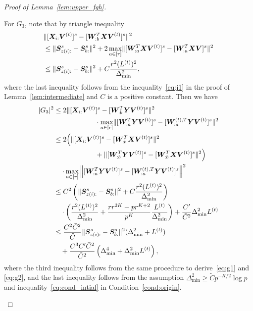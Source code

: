 \documentclass[journal]{IEEEtran}
\theoremstyle{definition}
\theoremstyle{definition}
\newcommand{\of}[1]{\left(#1\right)}
\begin{document}
\begin{proof}[Proof of Lemma~\ref{lem:upper_fgh}]
\begin{enumerate}[wide]
    For $G_3$, note that by triangle inequality
    \begin{align}
        &\onormSize{}{[\mX_{i:} \mV^{(t)}]^s  -  [  \mW_{:b}^T \mX \mV^{(t)} ]^s}^2 \\& \leq \onormSize{}{\mS_{z(i):}^s - \mS_{b:}^s}^2 + 2\max_{a \in [r]}\onormSize{}{[\mW_{:a}^T\mX \mV^{(t)}]^s - [\mW_{:a}^T\mX \mV]^s }^2\\
        & \leq \onormSize{}{\mS_{z(i):}^s - \mS_{b:}^s}^2 + C \frac{r^2 (L^{(t)})^2}{\Delta_{\min}^2}, \label{eq:g3xv_wxv}
    \end{align}
    where the last inequality follows from the inequality~\eqref{eq:j1} in the proof of Lemma~\ref{lem:intermediate} and $C$ is a positive constant.
   Then we have 
   \small
    \begin{align}
        |G_3|^2 & \leq 2 \onormSize{}{[\mX_{i:} \mV^{(t)}]^s  -  [  \mW_{:b}^T \mY \mV^{(t)} ]^s}^2  \\
        &  \quad \quad \quad \quad \quad  \quad \cdot \max_{a \in [r]} \onormSize{}{ [  \mW_{:a}^T \mY \mV^{(t)} ]^s -  [   \mW_{:a}^{(t),T} \mY \mV^{(t)}  ]^s}^2 \\
        & \leq 2 \Big( \onormSize{}{[\mX_{i:} \mV^{(t)}]^s  -  [  \mW_{:b}^T \mX \mV^{(t)} ]^s}^2  \\
        & \quad \quad \quad \quad \quad  \quad  +  \onormSize{}{ [  \mW_{:b}^T \mY \mV^{(t)} ]^s  -  [  \mW_{:b}^T \mX \mV^{(t)} ]^s}^2  \Big) \\
        & \quad \cdot \max_{a \in [r]} \onorm{ [  \mW_{:a}^T \mY \mV^{(t)} ]^s -  [   \mW_{:a}^{(t),T} \mY \mV^{(t)}  ]^s}^2\\
        & \leq C^2 \of{\onormSize{}{\mS_{z(i):}^s - \mS_{b:}^s}^2 + C \frac{r^2 (L^{(t)})^2}{\Delta_{\min}^2} } \\
        &  \quad \cdot \of{ \frac{r^2(L^{(t)})^2}{ \Delta_{\min}^2} + \frac{r r^{2K} + pr^{K+2}}{p^{K}} \frac{L^{(t)}}{\Delta_{\min}^2}}+\frac{C'}{\tilde C^2} \Delta_{\min}^2 L^{(t)} \\
        & \leq \frac{C^2 \bar C^2}{\tilde C} \onormSize{}{\mS_{z(i):}^s - \mS_{b:}^s}^2 (\Delta_{\min}^2 + L^{(t)}) \\
        & \quad +  \frac{C^3 C' \bar C^2}{\tilde C^2 }\of{\Delta_{\min}^4 +  \Delta_{\min}^2 L^{(t)}},\label{eq:g3}
    \end{align}
    \normalsize
    where the third inequality follows from the same procedure to derive~\eqref{eq:g1} and \eqref{eq:g2}, and the last inequality follows from the assumption $\Delta_{\min}^2 \geq \tilde C p^{-K/2} \log p$ and inequality~\eqref{eq:cond_intial} in Condition~\ref{cond:origin}.
    

\end{enumerate}
\end{proof}
\end{document}
